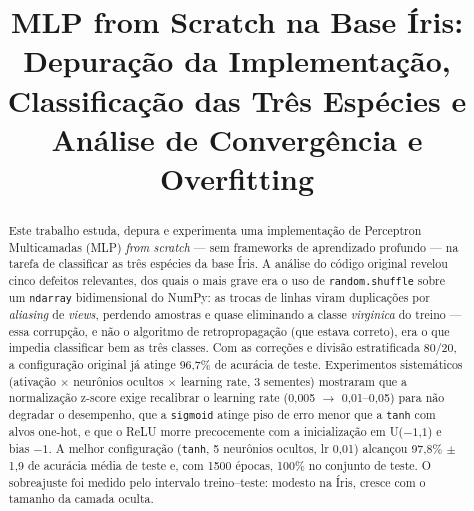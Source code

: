 \documentclass[conference]{IEEEtran}
\begin{document}
\title{MLP from Scratch na Base Íris: Depuração da Implementação, Classificação das Três Espécies e Análise de Convergência e Overfitting}

\author{
    \vspace{0.2cm}
}

\maketitle

\begin{abstract}
Este trabalho estuda, depura e experimenta uma implementação de Perceptron Multicamadas (MLP) \emph{from scratch} --- sem frameworks de aprendizado profundo --- na tarefa de classificar as três espécies da base Íris. A análise do código original revelou cinco defeitos relevantes, dos quais o mais grave era o uso de \texttt{random.shuffle} sobre um \texttt{ndarray} bidimensional do NumPy: as trocas de linhas viram duplicações por \emph{aliasing} de \emph{views}, perdendo amostras e quase eliminando a classe \textit{virginica} do treino --- essa corrupção, e não o algoritmo de retropropagação (que estava correto), era o que impedia classificar bem as três classes. Com as correções e divisão estratificada 80/20, a configuração original já atinge 96,7\% de acurácia de teste. Experimentos sistemáticos (ativação $\times$ neurônios ocultos $\times$ learning rate, 3 sementes) mostraram que a normalização z-score exige recalibrar o learning rate (0,005 $\to$ 0,01--0,05) para não degradar o desempenho, que a \texttt{sigmoid} atinge piso de erro menor que a \texttt{tanh} com alvos one-hot, e que o ReLU morre precocemente com a inicialização em U($-1$,$1$) e bias $-1$. A melhor configuração (\texttt{tanh}, 5 neurônios ocultos, lr 0,01) alcançou 97,8\% $\pm$ 1,9 de acurácia média de teste e, com 1500 épocas, 100\% no conjunto de teste. O sobreajuste foi medido pelo intervalo treino--teste: modesto na Íris, cresce com o tamanho da camada oculta.
\end{abstract}
\end{document}
